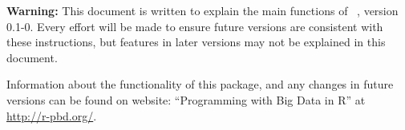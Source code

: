 {\color{red} \bf Warning:} This document is written to explain the main
functions of ~\citep{Schmidt2013pbdDEMOpackage}, version 0.1-0.
Every effort will be made to ensure future versions are consistent with
these instructions, but features in later versions may not be explained
in this document.

Information about the functionality of this package,
and any changes in future versions can be found on website:
``Programming with Big Data in R'' at
\url{http://r-pbd.org/}.

